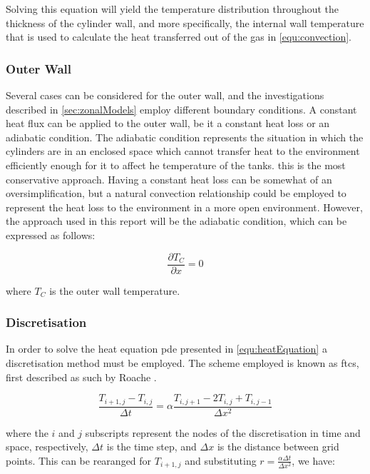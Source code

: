 Solving this equation will yield the temperature distribution throughout the thickness of the cylinder wall, and more specifically, the internal wall temperature that is used to calculate the heat transferred out of the gas in \cref{equ:convection}.

\subsubsection{Outer Wall}

Several cases can be considered for the outer wall, and the investigations described in \cref{sec:zonalModels} employ different boundary conditions. A constant heat flux can be applied to the outer wall, be it a constant heat loss or an adiabatic condition. The adiabatic condition represents the situation in which the cylinders are in an enclosed space which cannot transfer heat to the environment efficiently enough for it to affect he temperature of the tanks. this is the most conservative approach. Having a constant heat loss can be somewhat of an oversimplification, but a natural convection relationship could be employed to represent the heat loss to the environment in a more open environment. However, the approach used in this report will be the adiabatic condition, which can be expressed as follows:

\begin{equation}
\frac{\partial T_{C}}{\partial x} = 0
\end{equation}

\noindent where $T_{C}$ is the outer wall temperature.
 

\subsubsection{Discretisation}

In order to solve the heat equation \gls{pde} presented in \cref{equ:heatEquation} a discretisation method must be employed. The scheme employed is known as \gls{ftcs}, first described as such by Roache \cite{roache1976}. 

\begin{equation}
\frac{T_{i+1,j} - T_{i,j}}{\Delta t} = \alpha \frac{T_{i,j+1}-2T_{i,j} + T_{i,j-1}}{\Delta x^2}
\end{equation}

\noindent where the $i$ and $j$ subscripts represent the nodes of the discretisation in time and space, respectively, $\Delta t$ is the time step, and $\Delta x$ is the distance between grid points. This can be rearanged for $ T_{i+1,j}$ and substituting $r = \frac{\alpha \Delta t}{ \Delta x^2}$, we have:

